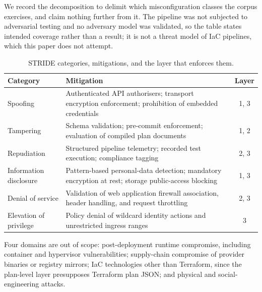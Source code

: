 \documentclass[smallextended]{svjour3}
\begin{document}
We record the decomposition to delimit which misconfiguration classes the corpus
exercises, and claim nothing further from it. The pipeline was not subjected to
adversarial testing and no adversary model was validated, so the table states
intended coverage rather than a result; it is not a threat model of IaC
pipelines, which this paper does not attempt.

\begin{table}[!t]
\caption{STRIDE categories, mitigations, and the layer that enforces them.}
\label{tab:stride}
\centering
\small
\setlength{\tabcolsep}{4pt}
\begin{tabularx}{\linewidth}{l >{\raggedright\arraybackslash}X c}
\toprule
\textbf{Category} & \textbf{Mitigation} & \textbf{Layer} \\
\midrule
Spoofing & Authenticated API authorisers; transport encryption enforcement;
prohibition of embedded credentials & 1, 3 \\
\addlinespace[2pt]
Tampering & Schema validation; pre-commit enforcement; evaluation of compiled
plan documents & 1, 2 \\
\addlinespace[2pt]
Repudiation & Structured pipeline telemetry; recorded test execution; compliance
tagging & 2, 3 \\
\addlinespace[2pt]
Information disclosure & Pattern-based personal-data detection; mandatory
encryption at rest; storage public-access blocking & 1, 3 \\
\addlinespace[2pt]
Denial of service & Validation of web application firewall association, header
handling, and request throttling & 2, 3 \\
\addlinespace[2pt]
Elevation of privilege & Policy denial of wildcard identity actions and
unrestricted ingress ranges & 3 \\
\bottomrule
\end{tabularx}
\end{table}

Four domains are out of scope: post-deployment runtime compromise, including
container and hypervisor vulnerabilities; supply-chain compromise of provider
binaries or registry mirrors; IaC technologies other than Terraform, since the
plan-level layer presupposes Terraform plan JSON; and physical and
social-engineering attacks.
\end{document}
